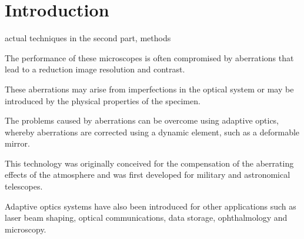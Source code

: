 \section{Introduction}
\label{sec:Introduction}

actual techniques in the second part, methods


\cite{AOM_biomedical}

The performance of these microscopes is often compromised by aberrations that lead to a reduction image resolution and contrast. 

These aberrations may arise from imperfections in the optical system or may be introduced by the physical properties of the specimen.
 
The problems caused by aberrations can be overcome using adaptive optics, whereby aberrations are corrected using a dynamic element, such as a deformable mirror.

This technology was originally conceived for the compensation of the aberrating effects of the atmosphere and was first developed for military and astronomical telescopes. 

Adaptive optics systems have also been introduced for other applications such as laser beam shaping, optical communications, data storage, ophthalmology and microscopy.\\

